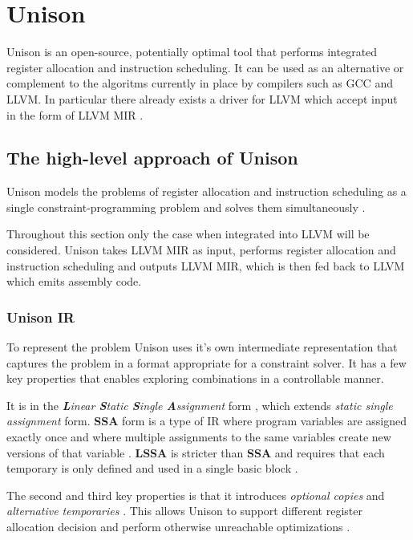 \section{Unison}

Unison is an open-source, potentially optimal tool that performs integrated register
allocation and instruction scheduling. It can be used as an alternative or complement to
the algoritms currently in place by compilers such as GCC and LLVM. In particular there
already exists a driver for LLVM which accept input in the form of LLVM MIR \cite{unison-docs}.

\subsection{The high-level approach of Unison}

Unison models the problems of register allocation and instruction scheduling as a single
constraint-programming problem and solves them simultaneously \cite{unison-docs,reg-alloc-inst-sched-uni}.

Throughout this section only the case when integrated into LLVM will be considered. Unison
takes LLVM MIR as input, performs register allocation and instruction scheduling and outputs
LLVM MIR, which is then fed back to LLVM which emits assembly code.

\subsubsection{Unison IR}

To represent the problem Unison uses it's own intermediate representation that captures
the problem in a format appropriate for a constraint solver. It has a few key properties
that enables exploring combinations in a controllable manner.

It is in the \textit{\textbf{L}inear \textbf{S}tatic \textbf{S}ingle \textbf{A}ssignment}
form \cite{reg-alloc-inst-sched-uni}, which extends \textit{static single assignment} form.
\textbf{SSA} form is a type of IR where program variables are assigned exactly once and
where multiple assignments to the same variables create new versions of that variable
\cite{gcc-ssa}. \textbf{LSSA} is stricter than \textbf{SSA} and requires that each temporary
is only defined and used in a single basic block \cite[Section~3.2]{constraint-based}.

The second and third key properties is that it introduces \textit{optional copies} and
\textit{alternative temporaries} \cite{reg-alloc-inst-sched-uni}. This allows Unison to
support different register allocation decision and perform otherwise unreachable optimizations
\cite{reg-alloc-inst-sched-uni, comb-spill}.

